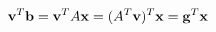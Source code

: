 \begin{equation} \label{eq:dualequiv}
{\bf v}^T {\bf b} = {\bf v}^T A {\bf x} = (A^T {\bf v})^T {\bf x} = {\bf g}^T {\bf x}
\end{equation}
